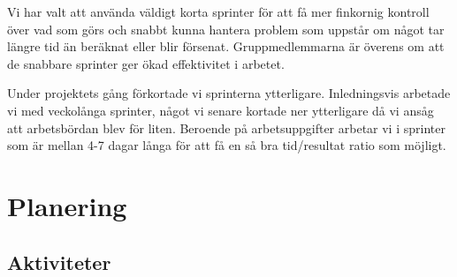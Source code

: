 \documentclass[a4paper,11pt]{article}
\begin{document}
  Vi har valt att använda väldigt korta sprinter för att få mer finkornig
  kontroll över vad som görs och snabbt kunna hantera problem som uppstår om
  något tar längre tid än beräknat eller blir försenat.  Gruppmedlemmarna är
  överens om att de snabbare sprinter ger ökad effektivitet i arbetet.

  Under projektets gång förkortade vi sprinterna ytterligare. Inledningsvis
  arbetade vi med veckolånga sprinter, något vi senare kortade ner ytterligare
  då vi ansåg att arbetsbördan blev för liten. Beroende på arbetsuppgifter
  arbetar vi i sprinter som är mellan 4-7 dagar långa för att få en så bra
  tid/resultat ratio som möjligt.

\section{Planering}

\subsection{Aktiviteter}
\end{document}
